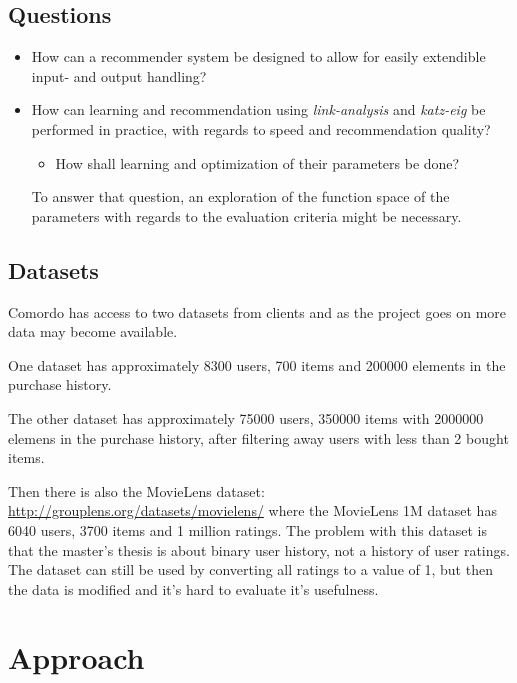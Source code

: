 \documentclass[11pt]{article}
\begin{document}
\newpage


\subsection*{Questions}

\begin{itemize}

    \item How can a recommender system be designed to allow for easily extendible input- and output handling?


    \item How can learning and recommendation using \textit{link-analysis} and \textit{katz-eig} be performed in practice, with regards to speed and recommendation quality?

        \begin{itemize}
            \item How shall learning and optimization of their parameters be done?
        \end{itemize}

        To answer that question, an exploration of the function space of the parameters with regards to the evaluation criteria might be necessary.

\end{itemize}


\subsection*{Datasets}

Comordo has access to two datasets from clients and as the project goes on more data may become available.

One dataset has approximately 8300 users, 700 items and 200000 elements in the purchase history.

The other dataset has approximately 75000 users, 350000 items with 2000000 elemens in the purchase history, after filtering away users with less than 2 bought items.

Then there is also the MovieLens dataset: \url{http://grouplens.org/datasets/movielens/} where the MovieLens 1M dataset has 6040 users, 3700 items and 1 million ratings. The problem with this dataset is that the master's thesis is about binary user history, not a history of user ratings. The dataset can still be used by converting all ratings to a value of 1, but then the data is modified and it's hard to evaluate it's usefulness.


\section*{Approach}
\end{document}
